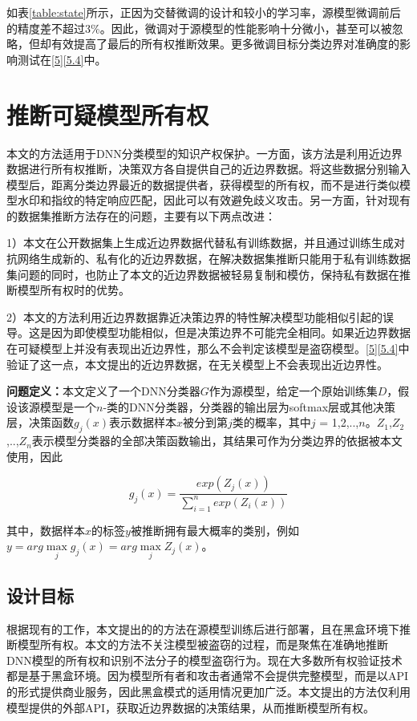 如表\ref{table:state}所示，正因为交替微调的设计和较小的学习率，源模型微调前后的精度差不超过3\%。因此，微调对于源模型的性能影响十分微小，甚至可以被忽略，但却有效提高了最后的所有权推断效果。更多微调目标分类边界对准确度的影响测试在\ref{5}\ref{5.4}中。

\section{推断可疑模型所有权}\label{4.3}

本文的方法适用于DNN分类模型的知识产权保护。一方面，该方法是利用近边界数据进行所有权推断，决策双方各自提供自己的近边界数据。将这些数据分别输入模型后，距离分类边界最近的数据提供者，获得模型的所有权，而不是进行类似模型水印和指纹的特定响应匹配，因此可以有效避免歧义攻击。另一方面，针对现有的数据集推断方法存在的问题，主要有以下两点改进：

1）本文在公开数据集上生成近边界数据代替私有训练数据，并且通过训练生成对抗网络生成新的、私有化的近边界数据，在解决数据集推断只能用于私有训练数据集问题的同时，也防止了本文的近边界数据被轻易复制和模仿，保持私有数据在推断模型所有权时的优势。

2）本文的方法利用近边界数据靠近决策边界的特性解决模型功能相似引起的误导。这是因为即使模型功能相似，但是决策边界不可能完全相同。如果近边界数据在可疑模型上并没有表现出近边界性，那么不会判定该模型是盗窃模型。\ref{5}\ref{5.4}中验证了这一点，本文提出的近边界数据，在无关模型上不会表现出近边界性。

\noindent\textbf{问题定义：}本文定义了一个DNN分类器$G$作为源模型，给定一个原始训练集$D$，假设该源模型是一个$n$-类的DNN分类器，分类器的输出层为softmax层或其他决策层，决策函数$g_j(x)$表示数据样本$x$被分到第$j$类的概率，其中$j$ = 1,2,..,$n$。$Z_1$,$Z_2$,..,$Z_n$表示模型分类器的全部决策函数输出，其结果可作为分类边界的依据被本文使用，因此

\begin{equation}
	g_j(x) = \frac{exp(Z_j(x))}{\sum_{i = 1}^n exp(Z_i(x))}
\end{equation}

\noindent 其中，数据样本$x$的标签$y$被推断拥有最大概率的类别，例如$y = arg \mathop{max} \limits_j g_j(x) = arg \mathop{max} \limits_j Z_j(x)$。

\subsection{设计目标}

根据现有的工作，本文提出的的方法在源模型训练后进行部署，且在黑盒环境下推断模型所有权。本文的方法不关注模型被盗窃的过程，而是聚焦在准确地推断DNN模型的所有权和识别不法分子的模型盗窃行为。现在大多数所有权验证技术都是基于黑盒环境。因为模型所有者和攻击者通常不会提供完整模型，而是以API的形式提供商业服务，因此黑盒模式的适用情况更加广泛。本文提出的方法仅利用模型提供的外部API，获取近边界数据的决策结果，从而推断模型所有权。

